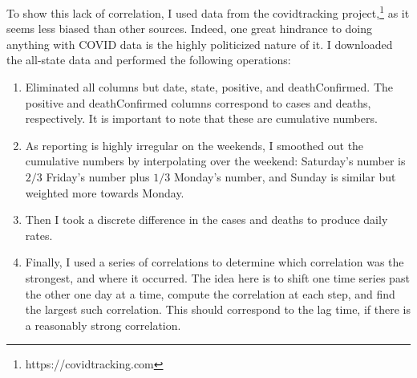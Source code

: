 \documentclass[12pt]{article}
\begin{document}
To show this lack of correlation, I used data from the covidtracking 
project,\footnote{https://covidtracking.com} 
as it seems less biased than other sources. Indeed, one
great hindrance to doing anything with COVID data is the highly politicized
nature of it. I downloaded the all-state data and performed the following
operations:
\begin{enumerate}[{\bf 1.}]
\item Eliminated all columns but date, state, positive, and deathConfirmed.
The positive and deathConfirmed columns correspond to cases and deaths,
respectively. It is important to note that these are cumulative numbers.
\item As reporting is highly irregular on the weekends, I smoothed out the
cumulative numbers by interpolating over the weekend: Saturday's number is
$2/3$ Friday's number plus $1/3$ Monday's number, and Sunday is similar but
weighted more towards Monday. 
\item Then I took a discrete difference in the cases and deaths to produce
daily rates.
\item Finally, I used a series of correlations to determine which correlation
was the strongest, and where it occurred. The idea here is to shift one time
series past the other one day at a time, compute the correlation at each step,
and find the largest such correlation. This should correspond to the lag time,
if there is a reasonably strong correlation. 
\end{enumerate} 
\end{document}
